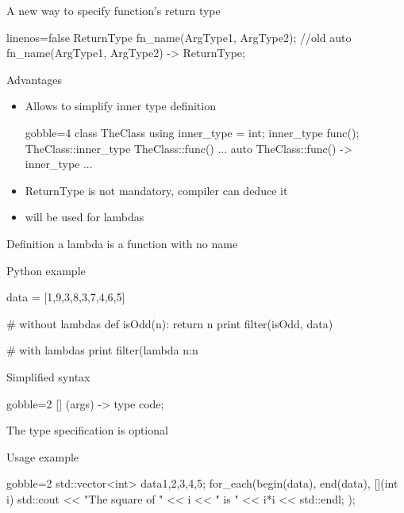 \begin{frame}[fragile]
  \begin{block}{A new way to specify function's return type}
    \begin{cppcode*}{linenos=false}
      ReturnType fn_name(ArgType1, ArgType2);  //old
      auto fn_name(ArgType1, ArgType2) -> ReturnType;
    \end{cppcode*}
  \end{block}
  \pause
  \begin{block}{Advantages}
    \begin{itemize}
    \item Allows to simplify inner type definition
      \begin{cppcode*}{gobble=4}
        class TheClass {
          using inner_type = int;
          inner_type func();
        }
        TheClass::inner_type TheClass::func() {...}
        auto TheClass::func() -> inner_type {...}
      \end{cppcode*}
    \item ReturnType is not mandatory, compiler can deduce it
    \item will be used for lambdas
    \end{itemize}
  \end{block}
\end{frame}


\begin{frame}[fragile]
  \begin{block}{Definition}
    a lambda is a function with no name
  \end{block}
  \pause
  \begin{exampleblock}{Python example}
    \begin{pythoncode*}{}
      data = [1,9,3,8,3,7,4,6,5]

      # without lambdas
      def isOdd(n):
        return n%
      print filter(isOdd, data)

      # with lambdas
      print filter(lambda n:n%
    \end{pythoncode*}
  \end{exampleblock}
\end{frame}

\begin{frame}[fragile]
  \begin{block}{Simplified syntax}
    \begin{cppcode*}{gobble=2}
      [] (args) -> type {
        code;
      }
    \end{cppcode*}
    The type specification is optional
  \end{block}
  \begin{exampleblock}{Usage example}
    \begin{cppcode*}{gobble=2}
      std::vector<int> data{1,2,3,4,5};
      for_each(begin(data), end(data),
               [](int i) {
                 std::cout << "The square of " << i
                           << " is " << i*i << std::endl;
               });
    \end{cppcode*}
  \end{exampleblock}
\end{frame}



